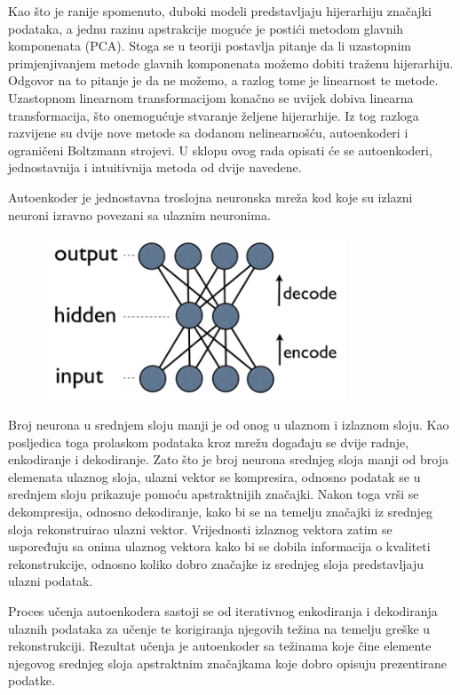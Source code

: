 \documentclass[lmodern, utf8, diplomski, numeric]{fer}
\begin{document}
Kao što je ranije spomenuto, duboki modeli predstavljaju hijerarhiju značajki podataka, a jednu razinu apstrakcije moguće je postići metodom glavnih komponenata (PCA). Stoga se u teoriji postavlja pitanje da li uzastopnim primjenjivanjem metode glavnih komponenata možemo dobiti traženu hijerarhiju. Odgovor na to pitanje je da ne možemo, a razlog tome je linearnost te metode. Uzastopnom linearnom transformacijom konačno se uvijek dobiva linearna transformacija, što onemogućuje stvaranje željene hijerarhije. Iz tog razloga razvijene su dvije nove metode sa dodanom nelinearnošću, autoenkoderi i ograničeni Boltzmann strojevi. U sklopu ovog rada opisati će se autoenkoderi, jednostavnija i intuitivnija metoda od dvije navedene.

Autoenkoder je jednostavna troslojna neuronska mreža kod koje su izlazni neuroni izravno povezani sa ulaznim neuronima. 

\begin{figure}[ht!]
\centering
\includegraphics[width=9cm]{slike/autoenkoder.png}
\caption{}
\end{figure}

Broj neurona u srednjem sloju manji je od onog u ulaznom i izlaznom sloju. Kao posljedica toga prolaskom podataka kroz mrežu događaju se dvije radnje, enkodiranje i dekodiranje. Zato što je broj neurona srednjeg sloja manji od broja elemenata ulaznog sloja, ulazni vektor se kompresira, odnosno podatak se u srednjem sloju prikazuje pomoću apstraktnijih značajki. Nakon toga vrši se dekompresija, odnosno dekodiranje, kako bi se na temelju značajki iz srednjeg sloja rekonstruirao ulazni vektor.
Vrijednosti izlaznog vektora zatim se uspoređuju sa onima ulaznog vektora kako bi se dobila informacija o kvaliteti rekonstrukcije, odnosno koliko dobro značajke iz srednjeg sloja predstavljaju ulazni podatak.

Proces učenja autoenkodera sastoji se od iterativnog enkodiranja i dekodiranja ulaznih podataka za učenje te korigiranja njegovih težina na temelju greške u rekonstrukciji. Rezultat učenja je autoenkoder sa težinama koje čine elemente njegovog srednjeg sloja apstraktnim značajkama koje dobro opisuju prezentirane podatke. 
\end{document}
